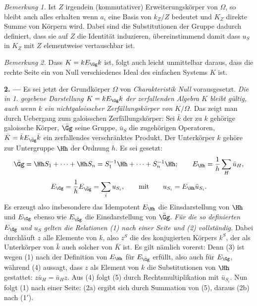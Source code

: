 \emph{Bemerkung 1.} Ist $Z$ irgendein (kommutativer) Erweiterungskörper von $\Omega$, so bleibt auch alles erhalten wenn $a_i$ eine Basis von $k_Z/Z$ bedeutet und $K_Z$ direkte Summe von Körpern wird. Dabei sind die Substitutionen der Gruppe dadurch definiert, dass sie auf $Z$ die Identität induzieren, übereinstimmend damit dass $u_S$ in $K_Z$ mit $Z$ elementweise vertauschbar ist.

\emph{Bemerkung 2.} Dass $K=kE_\Gg k$ ist, folgt auch leicht unmittelbar daraus, dass die rechte Seite ein von Null verschiedenes Ideal des einfachen Systems $K$ ist.

\medskip
\noindent\textbf{2. ---} Es sei jetzt der Grundkörper $\Omega$ von \emph{Charakteristik Null} vorausgesetzt. \emph{Die in 1. gegebene Darstellung $K=kE_\Gg k$ der zerfallenden Algebra $K$ bleibt gültig, auch wenn $k$ ein nichtgaloisscher Zerfällungskörper von $K/\Omega$.} Das zeigt man durch Uebergang zum galoisschen Zerfällungskörper: Sei $\bar k$ der zu $k$ gehörige galoissche Körper, $\bar\Gg$ seine Gruppe, $\bar u_S$ die zugehörigen Operatoren, $\bar K=\bar kE_{\bar\Gg}\bar k$ ein zerfallendes verschränktes Produkt. Der Unterkörper $k$ gehöre zur Untergruppe $\Hh$ der Ordnung $h$. Es sei gesetzt:
\[
\bar\Gg=\Hh S_1+\cdots+\Hh S_n
 =S_1^{-1}\Hh+\cdots+S_n^{-1}\Hh;
\qquad
E_\Hh=\frac1h\sum_H\bar u_H,
\]
\[
E_\Gg=\frac1hE_{\bar\Gg}=\sum_i u_{S_i},
\qquad\text{mit}\qquad
u_{S_i}=E_\Hh\bar u_{S_i}.
\]
Es erzeugt also insbesondere das Idempotent $E_\Hh$ die Einsdarstellung von $\Hh$ und $E_\Gg$ ebenso wie $E_{\bar\Gg}$ die Einsdarstellung von $\bar\Gg$. \emph{Für die so definierten $E_\Gg$ und $u_S$ gelten die Relationen (1) nach einer Seite und (2) vollständig.} Dabei durchläuft $z$ alle Elemente von $k$, also $z^S$ die des konjugierten Körpers $k^S$, der als Unterkörper von $\bar k$ auch solcher von $\bar K$ ist. Es gilt nämlich vorerst:
Denn (3) ist wegen (1) nach der Definition von $E_\Hh$ für $E_{\bar\Gg}$ erfüllt, also auch für $E_\Gg$, während (4) aussagt, dass $z$ als Element von $k$ die Substitutionen von $\Hh$ gestattet: $z\bar u_H=\bar u_Hz$. Aus (4) folgt (5) durch Rechtsmultiplikation mit $\bar u_{S_i}$. Nun folgt (1) nach einer Seite:
(2a) ergibt sich durch Summation von (5), daraus (2b) nach (1$'$).

